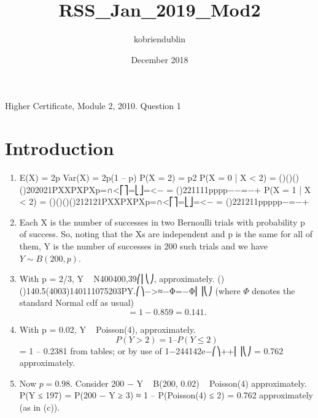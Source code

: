 \documentclass{article}
\title{RSS_Jan_2019_Mod2}
\author{kobriendublin }
\date{December 2018}
\begin{document}
Higher Certificate, Module 2, 2010. Question 1

\section{Introduction}

\begin{enumerate}
    \item
E(X) = 2p Var(X) = 2p(1 – p) P(X = 2) = p2
P(X = 0 | X < 2) = ()()()()202021PXXPXPXp=∩<⎡⎤=⎣⎦=<− = ()221111pppp−−=−+
P(X = 1 | X < 2) = ()()()()212121PXXPXPXp=∩<⎡⎤=⎣⎦=<− = ()221211ppppp−=−+

\smallskip
[Alternatively, $P(X = 1 | X < 2)$ may be obtained as 1 − P(X = 0 | X < 2).]
    \item Each X is the number of successes in two Bernoulli trials with probability p of success. So, noting that the Xs are independent and p is the same for all of them, Y is the number of successes in 200 such trials and we have $Y \sim B(200, p)$.
    \item With p = 2/3, Y ~ N400400,39⎛⎜⎝⎠, approximately.
()()140.5(4003)140111075203PY.⎛⎞−>≈−Φ=−Φ⎜⎟⎝⎠
(where $\Phi$ denotes the standard Normal cdf as usual)
\[= 1 − 0.859 = 0.141.\]
    \item With p = 0.02, Y ~ Poisson(4), approximately.
\[P(Y > 2) = 1 – P(Y \leq 2)\]
= 1 – 0.2381 from tables; or by use of 1−244142e−⎛⎞++⎜⎟⎝⎠
= 0.762 approximately.
    \item Now $p = 0.98$.
Consider 200 − Y ~ B(200, 0.02) ~ Poisson(4) approximately.
P(Y ≤ 197) = P(200 − Y ≥ 3)
≈ 1 – P(Poisson(4) ≤ 2) = 0.762 approximately (as in (c)).
\end{enumerate}
\end{document}
